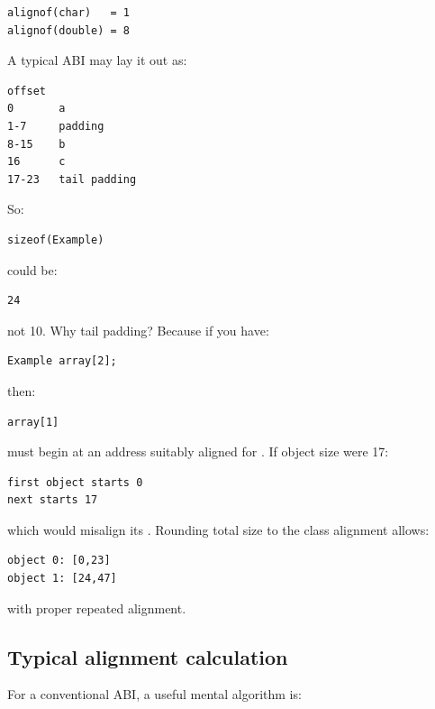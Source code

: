 \begin{verbatim}
alignof(char)   = 1
alignof(double) = 8
\end{verbatim}

A typical ABI may lay it out as:

\begin{verbatim}
offset
0       a
1-7     padding
8-15    b
16      c
17-23   tail padding
\end{verbatim}

So:

\begin{verbatim}
sizeof(Example)
\end{verbatim}

could be:

\begin{verbatim}
24
\end{verbatim}

not 10. Why tail padding? Because if you have:

\begin{verbatim}
Example array[2];
\end{verbatim}

then:

\begin{verbatim}
array[1]
\end{verbatim}

must begin at an address suitably aligned for . If object size were 17:

\begin{verbatim}
first object starts 0
next starts 17
\end{verbatim}

which would misalign its . Rounding total size to the class alignment allows:

\begin{verbatim}
object 0: [0,23]
object 1: [24,47]
\end{verbatim}

with proper repeated alignment.

\subsection{Typical alignment calculation}\label{05-engine-i-ch003-typical-alignment-calculation}

\hypertarget{05-engine-i-ch003-typical-alignment-calculation}{}

For a conventional ABI, a useful mental algorithm is:

